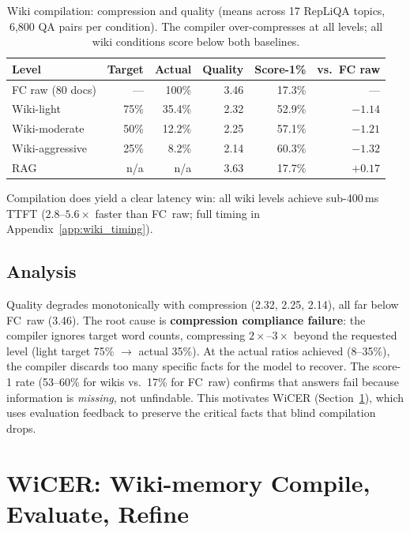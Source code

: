 \documentclass{article}
\begin{document}
\begin{table}[t]
\centering
\caption{Wiki compilation: compression and quality (means across 17 RepLiQA topics,
6{,}800 QA pairs per condition). The compiler over-compresses at all levels;
all wiki conditions score below both baselines.}
\label{tab:wiki_results}
\begin{tabular}{lrrrrr}
\toprule
\textbf{Level} & \textbf{Target} & \textbf{Actual} & \textbf{Quality} & \textbf{Score-1\%} & \textbf{vs.\ FC raw} \\
\midrule
FC raw (80 docs)   & ---  & 100\%  & 3.46  & 17.3\% & ---     \\
Wiki-light         & 75\% & 35.4\% & 2.32  & 52.9\% & $-1.14$ \\
Wiki-moderate      & 50\% & 12.2\% & 2.25  & 57.1\% & $-1.21$ \\
Wiki-aggressive    & 25\% &  8.2\% & 2.14  & 60.3\% & $-1.32$ \\
RAG                & n/a  & n/a    & 3.63  & 17.7\% & $+0.17$ \\
\bottomrule
\end{tabular}
\end{table}

Compilation does yield a clear latency win: all wiki levels achieve
sub-400\,ms TTFT ($2.8$--$5.6\times$ faster than FC~raw; full timing
in Appendix~\ref{app:wiki_timing}).

\subsection{Analysis}

Quality degrades monotonically with compression (2.32, 2.25, 2.14),
all far below FC~raw (3.46). The root cause is \textbf{compression
compliance failure}: the compiler ignores target word counts, compressing
$2\times$--$3\times$ beyond the requested level (light target 75\%
$\to$ actual 35\%). At the actual ratios achieved (8--35\%), the
compiler discards too many specific facts for the model to recover.
The score-1 rate (53--60\% for wikis vs.\ 17\% for FC~raw) confirms
that answers fail because information is \emph{missing}, not unfindable.
This motivates WiCER (Section~\ref{sec:wicer}), which uses evaluation
feedback to preserve the critical facts that blind compilation drops.

\section{WiCER: Wiki-memory Compile, Evaluate, Refine}
\label{sec:wicer}
\end{document}
